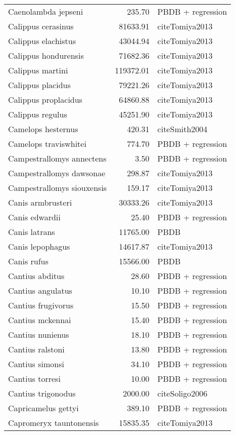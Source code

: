 \begin{table}[ht]
\begin{tabular}{lrl}
  Caenolambda jepseni & 235.70 & PBDB + regression \\ 
  Calippus cerasinus & 81633.91 & cite{Tomiya2013} \\ 
  Calippus elachistus & 43044.94 & cite{Tomiya2013} \\ 
  Calippus hondurensis & 71682.36 & cite{Tomiya2013} \\ 
  Calippus martini & 119372.01 & cite{Tomiya2013} \\ 
  Calippus placidus & 79221.26 & cite{Tomiya2013} \\ 
  Calippus proplacidus & 64860.88 & cite{Tomiya2013} \\ 
  Calippus regulus & 45251.90 & cite{Tomiya2013} \\ 
  Camelops hesternus & 420.31 & cite{Smith2004} \\ 
  Camelops traviswhitei & 774.70 & PBDB + regression \\ 
  Campestrallomys annectens & 3.50 & PBDB + regression \\ 
  Campestrallomys dawsonae & 298.87 & cite{Tomiya2013} \\ 
  Campestrallomys siouxensis & 159.17 & cite{Tomiya2013} \\ 
  Canis armbrusteri & 30333.26 & cite{Tomiya2013} \\ 
  Canis edwardii & 25.40 & PBDB + regression \\ 
  Canis latrans & 11765.00 & PBDB \\ 
  Canis lepophagus & 14617.87 & cite{Tomiya2013} \\ 
  Canis rufus & 15566.00 & PBDB \\ 
  Cantius abditus & 28.60 & PBDB + regression \\ 
  Cantius angulatus & 10.10 & PBDB + regression \\ 
  Cantius frugivorus & 15.50 & PBDB + regression \\ 
  Cantius mckennai & 15.40 & PBDB + regression \\ 
  Cantius nunienus & 18.10 & PBDB + regression \\ 
  Cantius ralstoni & 13.80 & PBDB + regression \\ 
  Cantius simonsi & 34.10 & PBDB + regression \\ 
  Cantius torresi & 10.00 & PBDB + regression \\ 
  Cantius trigonodus & 2000.00 & cite{Soligo2006} \\ 
  Capricamelus gettyi & 389.10 & PBDB + regression \\ 
  Capromeryx tauntonensis & 15835.35 & cite{Tomiya2013} \\ 

\end{tabular}
\end{table}
